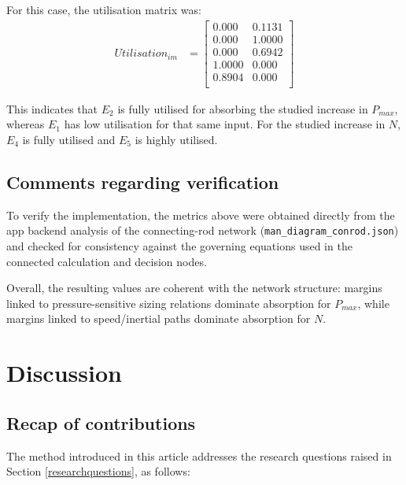 For this case, the utilisation matrix was:
\begin{equation} \label{eq:utimatrixout} 
\begin{aligned} Utilisation_{im} &=  \begin{bmatrix}
0.000 & 0.1131 \\
0.000 & 1.0000 \\
0.000 & 0.6942 \\
1.0000 & 0.000 \\
0.8904 & 0.000 \\
\end{bmatrix} \end{aligned} \end{equation}

This indicates that $E_2$ is fully utilised for absorbing the studied increase in $P_{max}$, whereas $E_1$ has low utilisation for that same input. For the studied increase in $N$, $E_4$ is fully utilised and $E_5$ is highly utilised.

\subsection{Comments regarding verification}\label{verification}

To verify the implementation, the metrics above were obtained directly from the app backend analysis of the connecting-rod network (\texttt{man\_diagram\_conrod.json}) and checked for consistency against the governing equations used in the connected calculation and decision nodes.

Overall, the resulting values are coherent with the network structure: margins linked to pressure-sensitive sizing relations dominate absorption for $P_{max}$, while margins linked to speed/inertial paths dominate absorption for $N$.

\section{Discussion}\label{Discussion}

\subsection{Recap of contributions}

The method introduced in this article addresses the research questions raised in Section \ref{researchquestions}, as follows:

